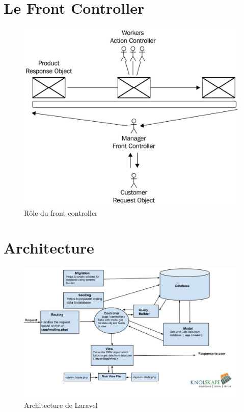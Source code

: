 \hypertarget{le-front-controller}{%
\section{Le Front Controller}\label{le-front-controller}}

\begin{figure}
\centering
\includegraphics{src/img/front-ctrl.jpg}
\caption{Rôle du front controller}
\end{figure}

\hypertarget{architecture}{%
\section{Architecture}\label{architecture}}

\begin{figure}
\centering
\includegraphics{src/img/laravel-architecture.jpg}
\caption{Architecture de Laravel}
\end{figure}

